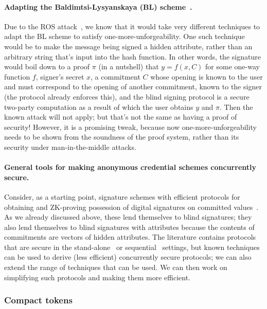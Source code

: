 \paragraph{Adapting the Baldimtsi-Lysyanskaya (BL) scheme~\cite{CCS:BalLys13}.} Due to the ROS attack~\cite{EC:BLLOR21}, we know that it would take very different techniques to adapt the BL scheme to satisfy one-more-unforgeability.  One such technique would be to make the message being signed a hidden attribute, rather than an arbitrary string that's input into the hash function.  In other words, the signature would boil down to a proof $\pi$ (in a nutshell) that $y = f(x,C)$ for some one-way function $f$, signer's secret $x$, a commitment $C$ whose opening is known to the user and must correspond to the opening of another commitment, known to the signer (the protocol already enforces this), and the blind signing protocol is a secure two-party computation as a result of which the user obtains $y$ and $\pi$.  Then the known attack will not apply; but that's not the same as having a proof of security! However, it is a promising tweak, because now one-more-unforgeability needs to be shown from the soundness of the proof system, rather than its security under man-in-the-middle attacks.

\paragraph{General tools for making anonymous credential schemes concurrently secure.} Consider, as a starting point, signature schemes with efficient protocols for obtaining and ZK-proving possession of digital signatures on committed values~\cite{lysyan02a,camlys02b}.  As we already discussed above, these lend themselves to blind signatures; they also lend themselves to blind signatures with attributes because the contents of commitments are vectors of hidden attributes.  The literature contains protocols that are secure in the stand-alone~\cite{C:CamLys04} or sequential~\cite{lysyan02a} settings, but known techniques~\cite{lysros22} can be used to derive (less efficient) concurrently secure protocols; we can also extend the range of techniques that can be used.  We can then work on simplifying such protocols and making them more efficient.

\subsubsection{Compact tokens}
\label{rg1:compact}

